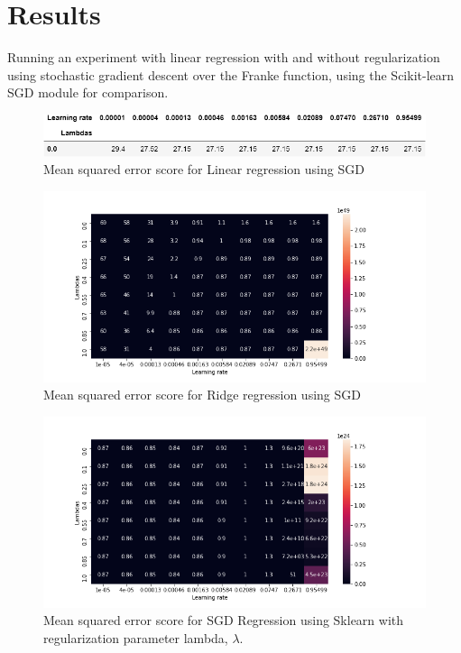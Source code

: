 \documentclass[reprint,english,notitlepage]{revtex4-2}  %
\begin{document}
\newpage


\section{Results}
Running an experiment with linear regression with and without regularization using stochastic gradient descent over the Franke function, using the Scikit-learn SGD module for comparison. 
\begin{figure}[!htb]
	\centering\includegraphics[trim=140 20 100 0, scale=0.4]{OLSSGD}
	\caption{Mean squared error score for Linear regression using SGD }\label{figure}
\end{figure}
\begin{figure}[!htb]
	\centering\includegraphics[trim=75 10 0 0, scale=0.45]{SGD Ridge}
	\caption{Mean squared error score for Ridge regression using SGD }\label{figure}
\end{figure}
\begin{figure}[!htb]
	\centering\includegraphics[trim=75 10 0 70, scale=0.45]{SGD Sklearn OLS}
	\caption{Mean squared error score for SGD Regression using Sklearn with regularization parameter lambda, $\lambda$. }\label{figure}
	\end{figure}
\end{document}
